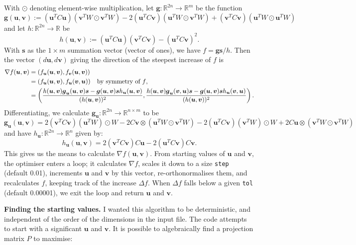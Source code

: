 \documentclass{article}
\renewcommand{\v}[1]{\boldsymbol{#1}}
\begin{document}
With $\odot$ denoting element-wise multiplication, let $\v{g}: \mathbb{R}^{2n} \to \mathbb{R}^m$ be the function
\[
\v{g}(\v{u}, \v{v}) := (\v{u}^TC\v{u})(\v{v}^TW\odot\v{v}^TW)
    - 2 (\v{u}^TC\v{v})(\v{u}^TW\odot\v{v}^TW)
    + (\v{v}^TC\v{v})(\v{u}^TW\odot\v{u}^TW)
\]
and let $h: \mathbb{R}^{2n} \to \mathbb{R}$ be
\[
h(\v{u}, \v{v}) := (\v{u}^T C \v{u})(\v{v}^T C \v{v}) - (\v{u}^T C \v{v})^2.
\]
With $\v{s}$ as the $1 \times m$ summation vector (vector of ones), we have $f = \v{g}\v{s}/h$. Then the vector $(d\v{u}, d\v{v})$ giving the direction of the steepest increase of $f$ is
\begin{align*}
\nabla f(\v{u}, \v{v}) &= \left(f_{\v{u}}(\v{u}, \v{v}), f_{\v{v}}(\v{u}, \v{v})\right)\\
    &= \left(f_{\v{u}}(\v{u}, \v{v}), f_{\v{u}}(\v{v}, \v{u})\right) \text{\;\; by symmetry of $f$,}\\
    &= \left(
        \frac{h(\v{u}, \v{v})\v{g}_{\v{u}}(\v{u}, \v{v})\v{s} - \v{g}(\v{u}, \v{v}) \v{s} h_{\v{u}}(\v{u}, \v{v})}{(h(\v{u}, \v{v}))^2}, 
        \frac{h(\v{u}, \v{v})\v{g}_{\v{u}}(\v{v}, \v{u})\v{s} - \v{g}(\v{u}, \v{v}) \v{s} h_{\v{u}}(\v{v}, \v{u})}{(h(\v{u}, \v{v}))^2}
    \right).
\end{align*}
Differentiating, we calculate $\v{g}_{\v{u}}: \mathbb{R}^{2n} \to \mathbb{R}^{n \times m}$ to be
\[
\v{g}_{\v{u}} (\v{u}, \v{v}) = 2(\v{v}^T C \v{v}) (\v{u}^TW)\odot W - 2 C\v{v} \otimes (\v{u}^TW \odot \v{v}^TW)
 - 2(\v{u}^T C \v{v}) (\v{v}^T W) \odot W + 2 C\v{u} \otimes (\v{v}^TW \odot \v{v}^TW)
\]
and have $h_{\v{u}}: \mathbb{R}^{2n} \to \mathbb{R}^{n}$ given by:
\[
h_{\v{u}}(\v{u}, \v{v}) = 2(\v{v}^T C \v{v}) C \v{u} - 2(\v{u}^T C \v{v}) C \v{v}.
\]
This gives us the means to calculate $\nabla f(\v{u}, \v{v})$. From starting values of $\v{u}$ and $\v{v}$, the optimiser enters a loop; it calculates $\nabla f$, scales it down to a size \texttt{step} (default 0.01), increments $\v{u}$ and $\v{v}$ by this vector, re-orthonormalises them, and recalculates $f$, keeping track of the increase $\Delta f$. When $\Delta f$ falls below a given \texttt{tol} (default 0.00001), we exit the loop and return $\v{u}$ and $\v{v}$.

\textbf{Finding the starting values.}
I wanted this algorithm to be deterministic, and independent of the order of the dimensions in the input file. The code attempts to start with a significant $\v{u}$ and $\v{v}$. It is possible to algebraically find a projection matrix $P$ to maximise:
\end{document}
